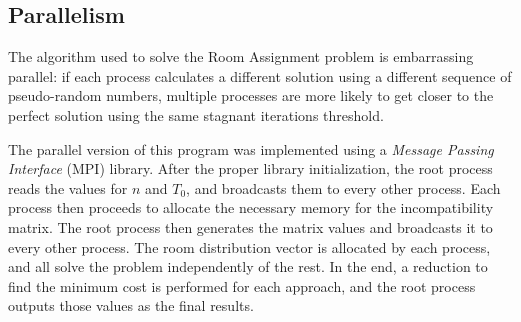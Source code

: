 \subsection{Parallelism}
\label{sec:parallelism}
The algorithm used to solve the Room Assignment problem is embarrassing parallel: if each process calculates a different solution using a different sequence of pseudo-random numbers, multiple processes are more likely to get closer to the perfect solution using the same stagnant iterations threshold.

The parallel version of this program was implemented using a \textit{Message Passing Interface} (MPI) library. After the proper library initialization, the root process reads the values for $n$ and $T_{0}$, and broadcasts them to every other process. Each process then proceeds to allocate the necessary memory for the incompatibility matrix. The root process then generates the matrix values and broadcasts it to every other process. The room distribution vector is allocated by each process, and all solve the problem independently of the rest. In the end, a reduction to find the minimum cost is performed for each approach, and the root process outputs those values as the final results.